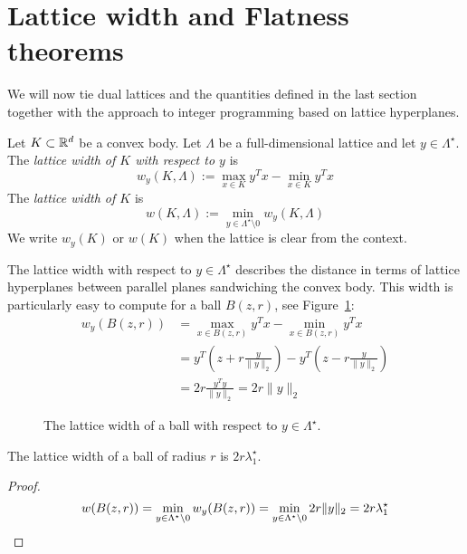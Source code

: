 \section{Lattice width and Flatness theorems}

We will now tie dual lattices and the quantities defined in the last section
together with the approach to integer programming based on lattice hyperplanes.

\begin{definition}
  Let $K \subset \mathbb{R}^d$ be a convex body.
  Let $\Lambda$ be a full-dimensional lattice and let $y \in \Lambda^\star$.
  The \emph{lattice width of $K$ with respect to $y$} is
  \[
    w_y(K, \Lambda) := \max_{x \in K} y^T x - \min_{x \in K} y^T x
  \]
  The \emph{lattice width of $K$} is
  \[
    w(K, \Lambda) := \min_{y \in \Lambda^\star \setminus 0} w_y(K,\Lambda)
  \]
  We write $w_y(K)$ or $w(K)$ when the lattice is clear from the context.
\end{definition}

The lattice width with respect to $y \in \Lambda^\star$
describes the distance in terms of lattice hyperplanes between parallel planes
sandwiching the convex body.
This width is particularly easy to compute for a ball $B(z,r)$,
see Figure~\ref{fig:lattice-width-ball}:
\begin{align*}
  w_y(B(z,r)) &= \max_{x \in B(z,r)} y^Tx - \min_{x \in B(z,r)} y^Tx \\
   &= y^T (z + r \frac{y}{\|y\|_2}) - y^T (z - r \frac{y}{\|y\|_2}) \\
   &= 2r \frac{y^T y}{\|y\|_2} = 2r \|y\|_2
\end{align*}
\begin{figure}
  \begin{center}
  \end{center}
  \caption{The lattice width of a ball with respect to $y \in \Lambda^\star$.}
  \label{fig:lattice-width-ball}
\end{figure}

\begin{lemma}
  The lattice width of a ball of radius $r$ is $2r\lambda_1^\star$.
\end{lemma}
\begin{proof}
  \[
    w(B(z,r)) = \min_{y \in \Lambda^\star \setminus 0} w_y(B(z,r))
      = \min_{y \in \Lambda^\star \setminus 0} 2r \|y\|_2 = 2r \lambda_1^\star
    \qedhere
  \]
\end{proof}

